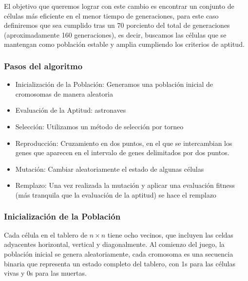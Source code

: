 El objetivo que queremos lograr con este cambio es encontrar un conjunto de células más eficiente
en el menor tiempo de generaciones, para este caso definiremos que sea cumplido tras un 
70 porciento del total de generaciones (aproximadamente 160 generaciones), es decir, buscamos 
las células que se mantengan como población estable y amplia cumpliendo los criterios de aptitud.

\subsubsection*{Pasos del algoritmo}

\begin{itemize}
    \item Inicialización de la Población: Generamos una población inicial de cromosomas de 
    manera aleatoria
    \item Evaluación de la Aptitud: astronaves
    \item Selección: Utilizamos un método de selección por torneo
    \item Reproducción: Cruzamiento en dos puntos, en el que se intercambian los genes que 
    aparecen en el intervalo de genes delimitados por dos puntos.
    \item Mutación: Cambiar aleatoriamente el estado de algunas células
    \item Remplazo: Una vez realizada la mutación y aplicar una evaluación fitness (más 
    tranquila que la evaluación de la aptitud) se hace el remplazo
\end{itemize}


\subsubsection*{Inicialización de la Población}

Cada célula en el tablero de $n \times n$ tiene ocho vecinos, que incluyen las celdas 
adyacentes horizontal, vertical y diagonalmente. Al comienzo del juego, la población inicial 
se genera aleatoriamente, cada cromosoma es una secuencia binaria que representa un estado 
completo del tablero, con 1s para las células vivas y 0s para las muertas.

